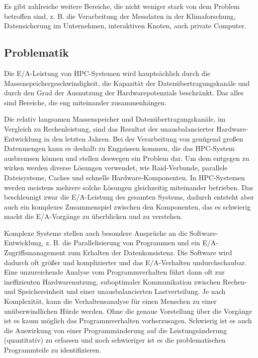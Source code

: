 Es gibt zahlreiche weitere Bereiche, die nicht weniger stark von dem Problem betroffen sind, z. B. die Verarbeitung der Messdaten in der Klimaforschung, Datensicherung im Unternehmen, interaktiven Knoten, auch private Computer.

\subsection{Problematik}

Die E/A-Leistung von HPC-Systemen wird hauptsächlich durch die Massenspeichergeschwindigkeit, die Kapazität der Datenübertragungskanäle und durch den Grad der Ausnutzung der Hardwarepotenzials beschränkt.
Das alles sind Bereiche, die eng miteinander zusammenhängen.

Die relativ langsamen Massenspeicher und Datenübertragungskanäle, im Vergleich zu Rechenleistung, sind das Resultat der unausbalancierter Hardware-Entwicklung in den letzten Jahren. 
Bei der Verarbeitung von genügend großen Datenmengen kann es deshalb zu Engpässen kommen, die das HPC-System ausbremsen können und stellen deswegen ein Problem dar.
Um dem entgegen zu wirken werden diverse Lösungen verwendet, wie Raid-Verbunde, parallele Dateisysteme, Caches und schnelle Hardware-Komponenten.
In HPC-Systemen werden meistens mehrere solche Lösungen gleichzeitig miteinander betrieben.
Das beschleunigt zwar die E/A-Leistung des gesamten Systems, dadurch entsteht aber auch ein komplexes Zusammenspiel zwischen den Komponenten, das es schwierig macht die E/A-Vorgänge zu überblicken und zu verstehen. 

Komplexe Systeme stellen auch besondere Ansprüche an die Software-Entwicklung, z. B. die Parallelisierung von Programmen und ein E/A-Zugriffsmanagement zum Erhalten der Datenkonsistenz.
Die Software wird dadurch oft größer und komplizierter und das E/A-Verhalten undurchschaubar.
Eine unzureichende Analyse vom Programmverhalten führt dann oft zur ineffizienten Hardwarenutzung, suboptimaler Kommunikation zwischen Rechen- und Speichereinheit und einer unausbalancierten Lastverteilung.
Je nach Komplexität, kann die Verhaltensanalyse für einen Menschen zu einer unüberwindlichen Hürde werden.
Ohne die genaue Vorstellung über die Vorgänge ist es kaum möglich das Programmverhalten vorherzusagen.
Schwierig ist es auch die Auswirkung von einer Programmänderung auf die Leistungsänderung (quantitativ) zu erfassen und noch schwieriger ist es die problematischen Programmteile zu identifizieren.

